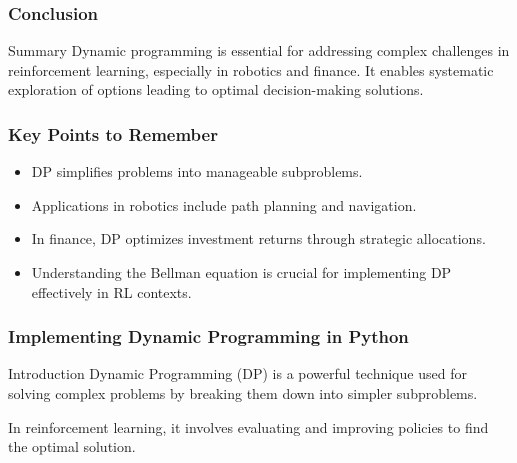 \documentclass{beamer}
\begin{document}
\begin{frame}[fragile]
    \frametitle{Conclusion}
    
    \begin{block}{Summary}
        Dynamic programming is essential for addressing complex challenges in reinforcement learning, especially in robotics and finance. It enables systematic exploration of options leading to optimal decision-making solutions.
    \end{block}
\end{frame}

\begin{frame}[fragile]
    \frametitle{Key Points to Remember}
    
    \begin{itemize}
        \item DP simplifies problems into manageable subproblems.
        \item Applications in robotics include path planning and navigation.
        \item In finance, DP optimizes investment returns through strategic allocations.
        \item Understanding the Bellman equation is crucial for implementing DP effectively in RL contexts.
    \end{itemize}
\end{frame}

\begin{frame}
    \frametitle{Implementing Dynamic Programming in Python}
    \begin{block}{Introduction}
        Dynamic Programming (DP) is a powerful technique used for solving complex problems by breaking them down into simpler subproblems.
        
        In reinforcement learning, it involves evaluating and improving policies to find the optimal solution. 
    \end{block}
\end{frame}
\end{document}
